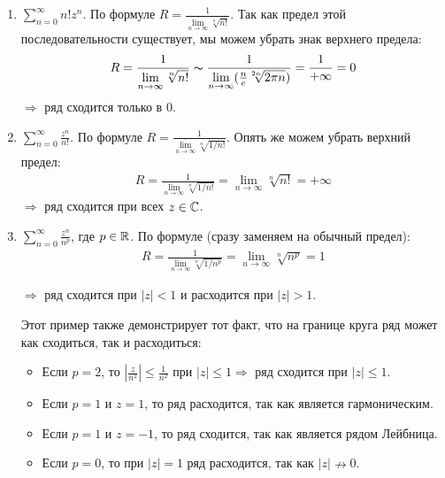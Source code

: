 \begin{examples}
    \begin{enumerate}
        \item $\sum\limits_{n=0}^\infty n!z^n$. 
        По формуле $R = \frac{1}{\overline{\lim\limits_{n \to \infty}} \sqrt[n]{n!}}$. 
        Так как предел этой последовательности существует, мы можем убрать знак верхнего предела: 
        \begin{gather*}
            R = \frac{1}{\lim\limits_{n \to \infty} \sqrt[n]{n!}} \thicksim \frac{1}{\lim\limits_{n \to \infty} (\frac{n}{e}\sqrt[2n]{2\pi n})} = \frac{1}{+\infty} = 0
        \end{gather*}
        $\Longrightarrow$ ряд сходится только в 0.
        \item $\sum\limits_{n=0}^\infty \frac{z^n}{n!}$. 
        По формуле $R = \frac{1}{\overline{\lim\limits_{n \to \infty}} \sqrt[n]{1/n!}}$.
        Опять же можем убрать верхний предел: 
        \begin{gather*}
            R = \frac{1}{\lim\limits_{n \to \infty} \sqrt[n]{1/n!}} = \lim\limits_{n \to \infty} \sqrt[n]{n!} = +\infty
        \end{gather*}
        $\Longrightarrow$ ряд сходится при всех $z \in \mathbb{C}$.
        \item $\sum\limits_{n=0}^\infty \frac{z^n}{n^p}$, где $p \in \mathbb{R}$.
        По формуле (сразу заменяем на обычный предел): 
        \begin{gather*} 
            R = \frac{1}{\lim\limits_{n \to \infty} \sqrt[n]{1/n^p}} = \lim\limits_{n \to \infty} \sqrt[n]{n^p} = 1
        \end{gather*}
        
        $\Longrightarrow$ ряд сходится при $|z| < 1$ и расходится при $|z| > 1$.

        Этот пример также демонстрирует тот факт, что на границе круга ряд может как сходиться, так и расходиться: \begin{itemize}
            \item Если $p = 2$, то $|\frac{z}{n^2}| \leqslant \frac{1}{n^2}$ при $|z| \leqslant 1 \Rightarrow$ ряд сходится при $|z| \leqslant 1$.
            \item Если $p = 1$ и $z = 1$, то ряд расходится, так как является гармоническим.
            \item Если $p = 1$ и $z = -1$, то ряд сходится, так как является рядом Лейбница.
            \item Если $p = 0$, то при $|z| = 1$ ряд расходится, так как $|z| \nrightarrow 0$.
        \end{itemize}
    \end{enumerate}    
\end{examples}
